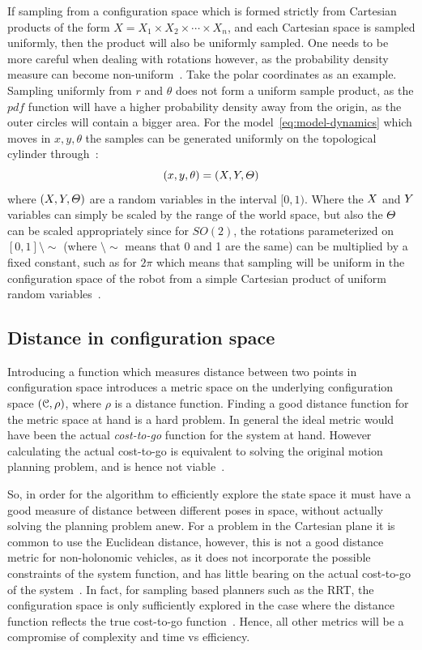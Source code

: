 If sampling from a configuration space which is formed strictly from Cartesian
products of the form \(X = X_1\times X_2\times \cdots \times X_n\), and each
Cartesian space is sampled uniformly, then the product will also be uniformly
sampled. One needs to be more careful when dealing with rotations however, as
the probability density measure can become non-uniform~\cite{Lav06}. Take the
polar coordinates as an example. Sampling uniformly from \(r\) and \(\theta\)
does not form a uniform sample product, as the \(pdf\) function will have a
higher probability density away from the origin, as the outer circles will
contain a bigger area. For the model~\cref{eq:model-dynamics} which moves in
\(x,y,\theta\) the samples can be generated uniformly on the topological
cylinder through~\cite{kuffnerEffectiveSamplingDistance2004}:
\[
  (x,y,\theta) = (\mathnormal{X}, \mathnormal{Y}, \mathnormal{\Theta})
\]
where \((\mathnormal{X}, \mathnormal{Y}, \mathnormal{\Theta})\) are a random
variables in the interval \([0,1)\). Where the \(\mathnormal{X}\) and
\(\mathnormal{Y}\) variables can simply be scaled by the range of the world
space, but also the \(\mathnormal{\Theta}\) can be scaled appropriately since
for \(SO(2)\), the rotations parameterized on \([0,1]\setminus\sim\) (where
\(\setminus\sim\) means that 0 and 1 are the same) can be multiplied by a fixed
constant, such as for \(2\pi\) which means that sampling will be uniform in the
configuration space of the robot from a simple Cartesian product of uniform
random variables~\cite{Lav06}.

\subsection{Distance in configuration space}

Introducing a function which measures distance between two points in
configuration space introduces a metric space on the underlying configuration
space \((\mathcal{C}{},\rho)\), where \(\rho\) is a distance
function. Finding a good distance function for the metric space at hand is a
hard problem. In general the ideal metric would have been the actual
\textit{cost-to-go} function for the system at hand. However calculating the
actual cost-to-go is equivalent to solving the original motion planning problem,
and is hence not viable~\cite{pengchengReducingMetricSensitivity2001}.

So, in order for the \rrtfunnel{} algorithm to efficiently explore the state
space it must have a good measure of distance between different poses in space,
without actually solving the planning problem anew. For a problem in the
Cartesian plane it is common to use the Euclidean distance, however, this is not
a good distance metric for non-holonomic vehicles, as it does not incorporate
the possible constraints of the system function, and has little bearing on the
actual cost-to-go of the system~\cite{parkFeedbackMotionPlanning2015}. In fact,
for sampling based planners such as the \ac{RRT}, the configuration space is
only sufficiently explored in the case where the distance function reflects the
true cost-to-go function~\cite{pengchengReducingMetricSensitivity2001}. Hence,
all other metrics will be a compromise of complexity and time vs efficiency.


